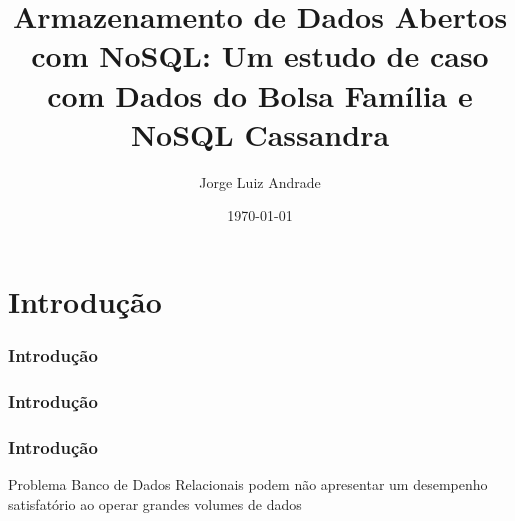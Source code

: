 \documentclass[brazil]{beamer}
\title[Bolsa Família e Cassandra]{Armazenamento de Dados Abertos com NoSQL: Um estudo de caso com Dados do Bolsa Família e NoSQL Cassandra} %
\author{Jorge Luiz Andrade} %
\institute[UnB] %
{
Universidade de Brasília \\ %
\medskip
\textit{jorgeluizandrade@outlook.com} %
}
\date{\today} %
\begin{document}
\begin{frame}
\titlepage %
\end{frame}



\section{Introdução} 
\begin{frame}

\frametitle{Introdução}
\end{frame}

\begin{frame}
\frametitle{Introdução}

\end{frame}

\begin{frame}
\frametitle{Introdução}
\vfill


\begin{block}{Problema}
	Banco de Dados Relacionais podem não apresentar um desempenho satisfatório ao operar grandes volumes de dados
\end{block}
\vfill

\vfill

\end{frame}
\end{document}
